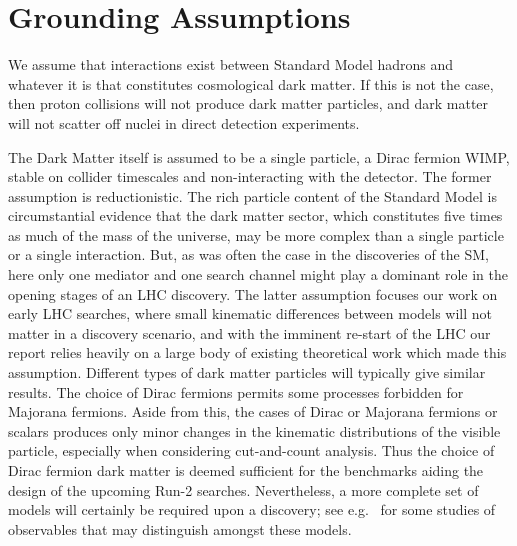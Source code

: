 \section{Grounding Assumptions}

We assume that interactions exist between Standard Model hadrons
and whatever it is that constitutes cosmological dark matter. If this
is not the case, then proton collisions will not produce dark matter
particles, and dark matter will not scatter off nuclei in direct
detection experiments.

The Dark Matter itself is assumed to be a single particle, a Dirac
fermion WIMP, stable on collider timescales and non-interacting with
the detector.  
The former assumption is reductionistic.
The rich
particle content of the Standard Model is circumstantial evidence that
the dark matter sector, which constitutes five times as much of the
mass of the universe, may be more complex than a single particle or a
single interaction. But, as was often the case in the discoveries of
the SM, here only one mediator and one search channel might play a
dominant role in the opening stages of an LHC discovery. The latter
assumption focuses our work on early LHC searches, where small
kinematic differences between models will not matter in a discovery
scenario, and with the imminent re-start of the LHC our report relies
heavily on a large body of existing theoretical work which made this
assumption. Different types of dark matter particles will typically
give similar results. The choice of Dirac fermions permits some
processes forbidden for Majorana fermions. Aside from this, the cases
of Dirac or Majorana fermions or scalars produces only minor changes
in the kinematic distributions of the visible particle, especially
when considering cut-and-count analysis. Thus the choice of Dirac
fermion dark matter is deemed sufficient for the benchmarks aiding the
design of the upcoming Run-2 searches. Nevertheless, a more complete
set of models will certainly be required upon a discovery; see
e.g.~\cite{Cotta:2012nj,Haisch:2013fla,Crivellin:2015wva} for some
studies of observables that may distinguish amongst these models.

